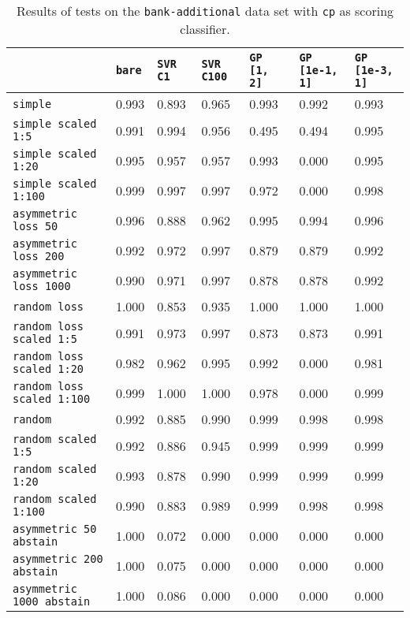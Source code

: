 \begin{table}
{\scriptsize
\begin{tabu}{l|l|l|l|l|l|l}
&\texttt{bare} &\texttt{SVR C1} &\texttt{SVR C100} &\texttt{GP [1, 2]} &\texttt{GP [1e-1, 1]} &\texttt{GP [1e-3, 1]}  \\
\hline
\texttt{simple} &0.993 &0.893 &0.965 &0.993 &0.992 &0.993 \\
\texttt{simple scaled 1:5} &0.991 &0.994 &0.956 &0.495 &0.494 &0.995 \\
\texttt{simple scaled 1:20} &0.995 &0.957 &0.957 &0.993 &0.000 &0.995 \\
\texttt{simple scaled 1:100} &0.999 &0.997 &0.997 &0.972 &0.000 &0.998 \\
\texttt{asymmetric loss 50} &0.996 &0.888 &0.962 &0.995 &0.994 &0.996 \\
\texttt{asymmetric loss 200} &0.992 &0.972 &0.997 &0.879 &0.879 &0.992 \\
\texttt{asymmetric loss 1000} &0.990 &0.971 &0.997 &0.878 &0.878 &0.992 \\
\texttt{random loss} &1.000 &0.853 &0.935 &1.000 &1.000 &1.000 \\
\texttt{random loss scaled 1:5} &0.991 &0.973 &0.997 &0.873 &0.873 &0.991 \\
\texttt{random loss scaled 1:20} &0.982 &0.962 &0.995 &0.992 &0.000 &0.981 \\
\texttt{random loss scaled 1:100} &0.999 &1.000 &1.000 &0.978 &0.000 &0.999 \\
\texttt{random} &0.992 &0.885 &0.990 &0.999 &0.998 &0.998 \\
\texttt{random scaled 1:5} &0.992 &0.886 &0.945 &0.999 &0.999 &0.999 \\
\texttt{random scaled 1:20} &0.993 &0.878 &0.990 &0.999 &0.999 &0.999 \\
\texttt{random scaled 1:100} &0.990 &0.883 &0.989 &0.999 &0.998 &0.998 \\
\texttt{asymmetric 50 abstain} &1.000 &0.072 &0.000 &0.000 &0.000 &0.000 \\
\texttt{asymmetric 200 abstain} &1.000 &0.075 &0.000 &0.000 &0.000 &0.000 \\
\texttt{asymmetric 1000 abstain} &1.000 &0.086 &0.000 &0.000 &0.000 &0.000 \\
\end{tabu} }
\caption{Results of tests on the \texttt{bank-additional} data set
         with \texttt{cp} as scoring classifier.}
\end{table}

